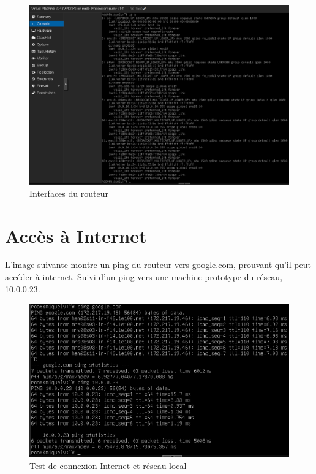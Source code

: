 \documentclass{article}
\begin{document}
\begin{figure}[h]
    \includegraphics[width=\textwidth, keepaspectratio]{interfaces_routeur.png}
    \caption{Interfaces du routeur}
\end{figure}

\FloatBarrier

\section{Accès à Internet}

L'image suivante montre un ping du routeur vers google.com, prouvant qu'il peut accéder à internet. Suivi d'un ping vers une machine prototype du réseau, 10.0.0.23.

\begin{figure}[h]
    \centering
    \includegraphics[width=1\textwidth]{router_ping.png}
    \caption{Test de connexion Internet et réseau local}
\end{figure}
\end{document}
